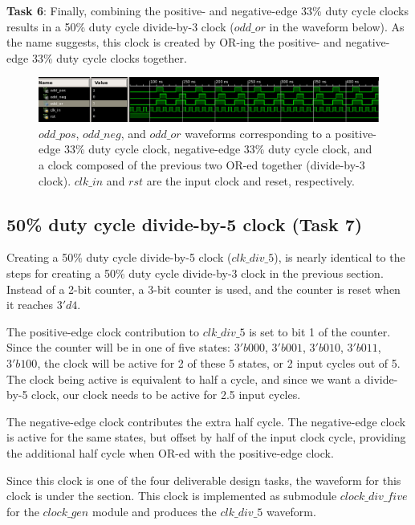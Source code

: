 \documentclass{article}
\begin{document}
\textbf{Task 6}: Finally, combining the positive- and negative-edge 33\% duty cycle clocks results in a 50\% duty cycle divide-by-3 clock ($odd\_or$ in the waveform below). As the name suggests, this clock is created by OR-ing the positive- and negative-edge 33\% duty cycle clocks together.

\begin{figure}[H]
    \centering
    \includegraphics[scale=0.45]{../figs/clock_33_percent.png}
    \caption{$odd\_pos$, $odd\_neg$, and $odd\_or$ waveforms corresponding to a positive-edge 33\% duty cycle clock, negative-edge 33\% duty cycle clock, and a clock composed of the previous two OR-ed together (divide-by-3 clock). $clk\_in$ and $rst$ are the input clock and reset, respectively.}
    \label{fig:clk100_200_zoomedout}
\end{figure}

\subsection{50\% duty cycle divide-by-5 clock (Task 7)}\label{sec:clk5}
Creating a 50\% duty cycle divide-by-5 clock ($clk\_div\_5$), is nearly identical to the steps for creating a 50\% duty cycle divide-by-3 clock in the previous section. Instead of a 2-bit counter, a 3-bit counter is used, and the counter is reset when it reaches $3'd4$.

The positive-edge clock contribution to $clk\_div\_5$ is set to bit 1 of the counter. Since the counter will be in one of five states: $3'b000$, $3'b001$, $3'b010$, $3'b011$, $3'b100$, the clock will be active for 2 of these 5 states, or 2 input cycles out of 5. The clock being active is equivalent to half a cycle, and since we want a divide-by-5 clock, our clock needs to be active for 2.5 input cycles.

The negative-edge clock contributes the extra half cycle. The negative-edge clock is active for the same states, but offset by half of the input clock cycle, providing the additional half cycle when OR-ed with the positive-edge clock.

Since this clock is one of the four deliverable design tasks, the waveform for this clock is under the  section. This clock is implemented as submodule $clock\_div\_five$ for the $clock\_gen$ module and produces the $clk\_div\_5$ waveform.
\end{document}
